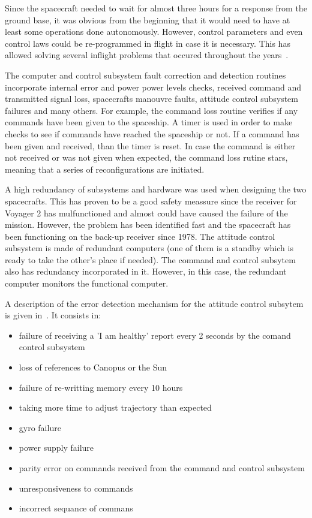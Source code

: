 Since the spacecraft needed to wait for almost three hours for a response from
the ground base, it was obvious from the beginning that it would need to have at
least some operations done autonomously. However, control parameters and even
control laws could be re-programmed in flight in case it is necessary. This has
allowed solving several inflight problems that occured throughout the
years~\cite{litty}.

The computer and control subsystem fault correction and detection routines
incorporate internal error and power power levels checks, received command and
transmitted signal loss, spacecrafts manouvre faults, attitude control subsystem
failures and many others. For example, the command loss routine verifies if any
commands have been given to the spaceship. A timer is used in order to make
checks to see if commands have reached the spaceship or not. If a command has
been given and received, than the timer is reset. In case the command is either
not received or was not given when expected, the command loss rutine stars,
meaning that a series of reconfigurations are initiated.

A high redundancy of subsystems and hardware was used when designing the two
spacecrafts. This has proven to be a good safety meassure since the receiver for
Voyager 2 has mulfunctioned and almost could have caused the failure of the
mission. However, the problem has been identified fast and the spacecraft has
been functioning on the back-up receiver since 1978. The attitude control subsystem
is made of redundant computers (one of them is a standby which is ready to take
the other's place if needed). The command and control subsytem also has
redundancy incorporated in it. However, in this case, the redundant computer
monitors the functional computer.

A description of the error detection mechanism for the attitude control subsytem
is given in~\cite{ft-space-avionics}. It consists in:
\begin{itemize}
  \item failure of receiving a 'I am healthy' report every 2 seconds by the
  comand control subsystem
  \item loss of references to Canopus or the Sun
  \item failure of re-writting memory every 10 hours
  \item taking more time to adjust trajectory than expected
  \item gyro failure
  \item power supply failure
  \item parity error on commands received from the command and control subsystem
  \item unresponsiveness to commands
  \item incorrect sequance of commans
\end{itemize}

